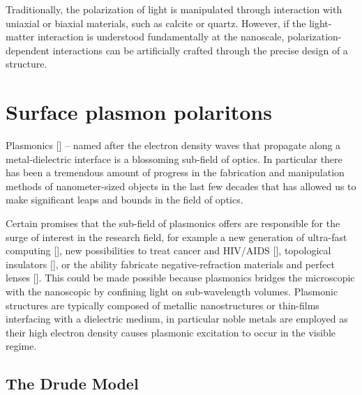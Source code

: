 Traditionally, the polarization of light is manipulated through interaction with uniaxial or biaxial materials, such as calcite or quartz. However, if the light-matter interaction is understood fundamentally at the nanoscale, polarization-dependent interactions can be artificially crafted through the precise design of a structure. 

\section{Surface plasmon polaritons}

Plasmonics [\cite{Barnes}] – named after the electron density waves that propagate along a metal-dielectric interface is a blossoming sub-field of optics. In particular there has been a tremendous amount of progress in the fabrication and manipulation methods of nanometer-sized objects in the last few decades that has allowed us to make significant leaps and bounds in the field of optics. %

Certain promises that the sub-field of plasmonics offers are responsible for the surge of interest in the research field, for example a new generation of ultra-fast computing [\cite{Atwater07}], new possibilities to treat cancer and HIV/AIDS [\cite{Kumar2011}], topological insulators [\cite{Deshko16}], or the ability fabricate negative-refraction materials and perfect lenses [\cite{Urbas2016}]. This could be made possible because plasmonics bridges the microscopic with the nanoscopic by confining light on sub-wavelength volumes. Plasmonic structures are typically composed of metallic nanostructures or thin-films interfacing with a dielectric medium, in particular noble metals are employed as their high electron density causes plasmonic excitation to occur in the visible regime.

\subsection{The Drude Model}

